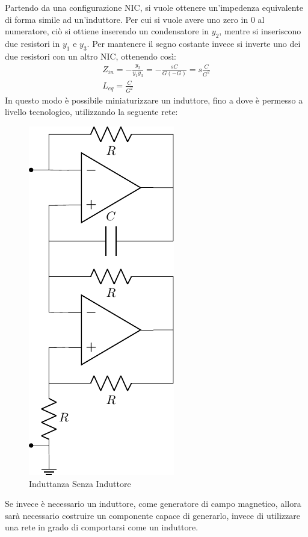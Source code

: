 \documentclass{article}
\numberwithin{equation}{subsection}
\begin{document}
Partendo da una configurazione NIC, si vuole ottenere un'impedenza equivalente di forma simile ad un'induttore. Per cui si vuole avere uno zero 
in $0$ al numeratore, ciò si ottiene inserendo un condensatore in $y_2$, mentre si inseriscono due resistori in $y_1$ e $y_3$. Per mantenere il 
segno costante invece si inverte uno dei due resistori con un altro NIC, ottenendo così:
\begin{gather*}
    Z_{in}=-\displaystyle\frac{y_2}{y_1y_3}=-\frac{sC}{G(-G)}=s\frac{C}{G^2}\\
    L_{eq}=\displaystyle\frac{C}{G^2}
\end{gather*}
In questo modo è possibile miniaturizzare un induttore, fino a dove è permesso a livello tecnologico, utilizzando la seguente rete:
\begin{figure}[H]%
    \centering
    \includegraphics{amplificatore-induttore-nic.pdf}%
    \caption{Induttanza Senza Induttore}
    \label{fig:amplificatore-induttore-nic}
\end{figure}

Se invece è necessario un induttore, come generatore di campo magnetico, allora sarà necessario costruire un componente capace di generarlo, invece 
di utilizzare una rete in grado di comportarsi come un induttore. 
\end{document}

